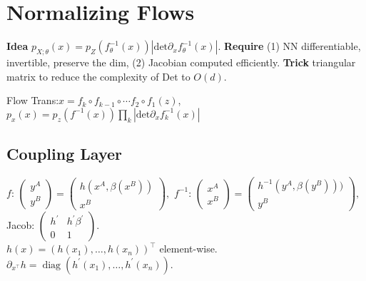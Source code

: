 \section{Normalizing Flows}
\textbf{Idea} \( p_{X;\theta}(x)=p_{Z}(f_{\theta}^{-1}(x))|\text{det}\partial_{x} f_{\theta}^{-1}(x)|\).
\textbf{Require} (1) NN differentiable, invertible, preserve the dim, (2) Jacobian computed efficiently.
\textbf{Trick} triangular matrix to reduce the complexity of Det to \(O(d)\).

Flow Trans:\({x} = f_{k} \circ f_{k-1} \circ \cdots f_{2} \circ f_{1}(z)\), \(p_{x}(x)=p_{z}(f^{-1}(x)) \prod_{k}|\text{det}\partial_{x} f_{k}^{-1}(x)| \)


\subsection*{Coupling Layer}
\textsf{$f$\!:\!}
\(\left(\begin{array}{c}
        y^{A} \\
        y^{B}
    \end{array}\right)=\left(\begin{array}{c}
        h(x^{A}, \beta(x^{B})) \\
        x^{B}
    \end{array}\right),\)
\textsf{$f^{-1}$\!:\!} \(\left(\begin{array}{l}
        x^{A} \\
        x^{B}
    \end{array}\right)=\left(\begin{array}{c}
        h^{-1}(y^{A}, \beta(y^{B}))) \\
        y^{B}
    \end{array}\right),\)
Jacob: \(\left(\begin{array}{cc}
        h^{\prime} & h^{\prime} \beta^{\prime} \\
        0          & 1
    \end{array}\right).\)\\
\(h(x) = (h(x_{1}), \ldots, h(x_{n}))^{\top}\) element-wise. \( \partial_{x^{\top}} h=\operatorname{diag}(h^{\prime}(x_{1}), \ldots, h^{\prime}(x_{n}))\).

